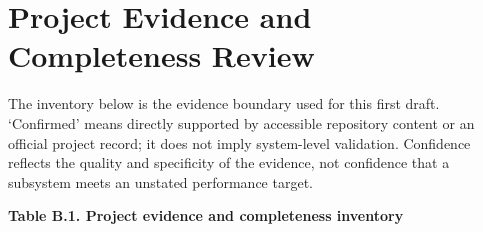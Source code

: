 \chapter{Project Evidence and Completeness Review}\label{ch:project-evidence-and-completeness-review}

The inventory below is the evidence boundary used for this first draft.
`Confirmed' means directly supported by accessible repository content or
an official project record; it does not imply system-level validation.
Confidence reflects the quality and specificity of the evidence, not
confidence that a subsystem meets an unstated performance target.

\clearpage
\begin{landscape}
\par\medskip\noindent\singlespacing
{}
\textbf{Table B.1. Project evidence and completeness inventory}\par


\end{landscape}
